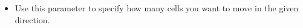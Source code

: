 % 
\begin{itemize}
\item Use this parameter to specify how many cells you want to move in the given direction.  
\end{itemize}
